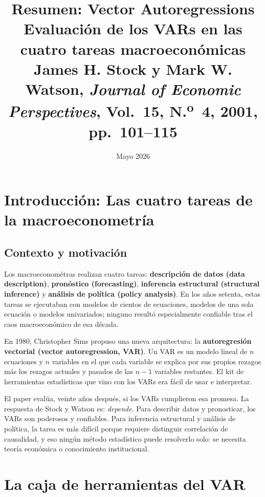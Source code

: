 \documentclass[12pt]{article}
\title{\textbf{Resumen: Vector Autoregressions}\\
\large Evaluaci\'on de los VARs en las cuatro tareas macroecon\'omicas\\
\normalsize James H. Stock y Mark W. Watson, \textit{Journal of Economic Perspectives}, Vol.\ 15, N.\textsuperscript{o}~4, 2001, pp.\ 101--115}
\author{}
\date{Mayo 2026}
\begin{document}
\maketitle
\tableofcontents
\newpage

\section{Introducci\'on: Las cuatro tareas de la macroeconometr\'ia}

\subsection{Contexto y motivaci\'on}

Los macroeconom\'etras realizan cuatro tareas: \textbf{descripci\'on de datos (data description)}, \textbf{pron\'ostico (forecasting)}, \textbf{inferencia estructural (structural inference)} y \textbf{an\'alisis de pol\'itica (policy analysis)}. En los a\~nos setenta, estas tareas se ejecutaban con modelos de cientos de ecuaciones, modelos de una sola ecuaci\'on o modelos univariados; ninguno result\'o especialmente confiable tras el caos macroecon\'omico de esa d\'ecada.

En 1980, Christopher Sims propuso una nueva arquitectura: la \textbf{autoregresi\'on vectorial (vector autoregression, VAR)}. Un VAR es un modelo lineal de $n$ ecuaciones y $n$ variables en el que cada variable se explica por sus propios rezagos m\'as los rezagos actuales y pasados de las $n-1$ variables restantes. El kit de herramientas estad\'isticas que vino con los VARs era f\'acil de usar e interpretar.

\begin{intuicion}
El paper eval\'ua, veinte a\~nos despu\'es, si los VARs cumplieron esa promesa. La respuesta de Stock y Watson es: \textit{depende}. Para describir datos y pronosticar, los VARs son poderosos y confiables. Para inferencia estructural y an\'alisis de pol\'itica, la tarea es m\'as dif\'icil porque requiere distinguir correlaci\'on de causalidad, y eso ning\'un m\'etodo estad\'istico puede resolverlo solo: se necesita teor\'ia econ\'omica o conocimiento institucional.
\end{intuicion}

\section{La caja de herramientas del VAR}
\end{document}
